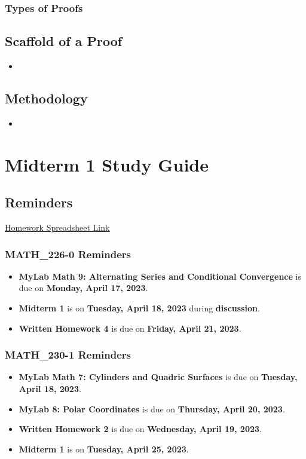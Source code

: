 \documentclass{report}
\begin{document}
\begin{sloppypar}
\subsection{Types of Proofs}
\section{Scaffold of a Proof}
\begin{itemize}
  \item

\end{itemize}


\section{Methodology}
\begin{itemize}
  \item

\end{itemize}

\chapter{Midterm 1 Study Guide}

\section{Reminders}
\href{https://docs.google.com/spreadsheets/d/1TyioZztD7VCczgR6k3s6krNdZ__pRMtqVNYFrWhcSLc/edit#gid=0}{\underline{Homework Spreadsheet Link}}
\subsection{MATH\_226-0 Reminders}
\begin{itemize}
  \item \textbf{MyLab Math 9: Alternating Series and
        Conditional Convergence} is due on \textbf{Monday, April 17, 2023}.
  \item \textbf{Midterm 1} is on \textbf{Tuesday,
        April 18, 2023} during \textbf{discussion}.
  \item \textbf{Written Homework 4} is due on
        \textbf{Friday, April 21, 2023}.
\end{itemize}
\subsection{MATH\_230-1 Reminders}
\begin{itemize}
  \item \textbf{MyLab Math 7: Cylinders and
        Quadric Surfaces} is due on \textbf{Tuesday,
        April 18, 2023}.
  \item \textbf{MyLab 8: Polar Coordinates} is due
        on \textbf{Thursday, April 20, 2023}.
  \item \textbf{Written Homework 2} is due on
        \textbf{Wednesday, April 19, 2023}.
  \item \textbf{Midterm 1} is on \textbf{Tuesday,
        April 25, 2023}.
\end{itemize}


\end{sloppypar}
\end{document}
